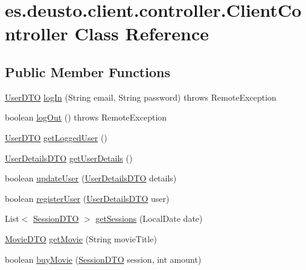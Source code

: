 \hypertarget{classes_1_1deusto_1_1client_1_1controller_1_1_client_controller}{}\section{es.\+deusto.\+client.\+controller.\+Client\+Controller Class Reference}
\label{classes_1_1deusto_1_1client_1_1controller_1_1_client_controller}
\subsection*{Public Member Functions}
\begin{DoxyCompactItemize}
\item 
\mbox{\hyperlink{classes_1_1deusto_1_1server_1_1data_1_1_user_d_t_o}{User\+D\+TO}} \mbox{\hyperlink{classes_1_1deusto_1_1client_1_1controller_1_1_client_controller_a075c2e627be920454324dacbbc72295c}{log\+In}} (String email, String password)  throws Remote\+Exception 
\item 
boolean \mbox{\hyperlink{classes_1_1deusto_1_1client_1_1controller_1_1_client_controller_a9379da9c24d71d3ebafaa44e0f858340}{log\+Out}} ()  throws Remote\+Exception 
\item 
\mbox{\hyperlink{classes_1_1deusto_1_1server_1_1data_1_1_user_d_t_o}{User\+D\+TO}} \mbox{\hyperlink{classes_1_1deusto_1_1client_1_1controller_1_1_client_controller_ac9d06db0017e2f06d06e8669398118f4}{get\+Logged\+User}} ()
\item 
\mbox{\hyperlink{classes_1_1deusto_1_1server_1_1data_1_1_user_details_d_t_o}{User\+Details\+D\+TO}} \mbox{\hyperlink{classes_1_1deusto_1_1client_1_1controller_1_1_client_controller_ac1bd9affe27668ee49320daae38d67a0}{get\+User\+Details}} ()
\item 
boolean \mbox{\hyperlink{classes_1_1deusto_1_1client_1_1controller_1_1_client_controller_ad1a2384c7c7f73d40d8d50c4bf77be7d}{update\+User}} (\mbox{\hyperlink{classes_1_1deusto_1_1server_1_1data_1_1_user_details_d_t_o}{User\+Details\+D\+TO}} details)
\item 
boolean \mbox{\hyperlink{classes_1_1deusto_1_1client_1_1controller_1_1_client_controller_a8f77e4957f536e48d7012d643d2c6cb8}{register\+User}} (\mbox{\hyperlink{classes_1_1deusto_1_1server_1_1data_1_1_user_details_d_t_o}{User\+Details\+D\+TO}} user)
\item 
List$<$ \mbox{\hyperlink{classes_1_1deusto_1_1server_1_1data_1_1_session_d_t_o}{Session\+D\+TO}} $>$ \mbox{\hyperlink{classes_1_1deusto_1_1client_1_1controller_1_1_client_controller_a06a84e0834fb21c31f4988e26ee6dedf}{get\+Sessions}} (Local\+Date date)
\item 
\mbox{\hyperlink{classes_1_1deusto_1_1server_1_1data_1_1_movie_d_t_o}{Movie\+D\+TO}} \mbox{\hyperlink{classes_1_1deusto_1_1client_1_1controller_1_1_client_controller_ae371135958d6f88011239d360d936ada}{get\+Movie}} (String movie\+Title)
\item 
boolean \mbox{\hyperlink{classes_1_1deusto_1_1client_1_1controller_1_1_client_controller_a92f0a66750a4f02c11de68814bc0d96f}{buy\+Movie}} (\mbox{\hyperlink{classes_1_1deusto_1_1server_1_1data_1_1_session_d_t_o}{Session\+D\+TO}} session, int amount)
\end{DoxyCompactItemize}
